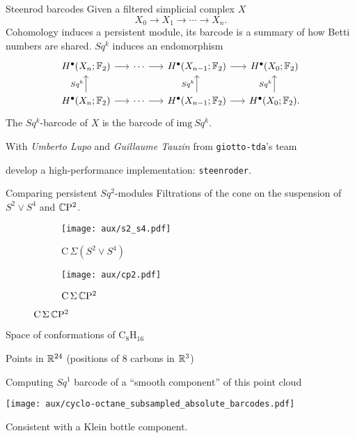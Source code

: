 \begin{frame}[fragile]{Steenrod barcodes}
	Given a filtered simplicial complex $X$
	\[
	X_0 \to X_1 \to \cdots \to X_n.
	\]
	Cohomology induces a \textcolor{pblue}{persistent module}, its \textcolor{pblue}{barcode} is a summary of how Betti numbers are shared.
	$Sq^k$ induces an endomorphism
	\[
	\begin{tikzcd}[column sep = 15]
	H^\bullet(X_n; \Ftwo) \arrow[r] & \cdots \arrow[r] & H^\bullet(X_{n-1}; \Ftwo) \arrow[r] & H^\bullet(X_0; \Ftwo) \\
	H^\bullet(X_n; \Ftwo) \arrow[u, "Sq^k"] \arrow[r] & \cdots \arrow[r] & H^\bullet(X_{n-1}; \Ftwo) \arrow[u, "Sq^k"] \arrow[r] & H^\bullet(X_0; \Ftwo) \arrow[u, "Sq^k"].
	\end{tikzcd}
	\]
	\pause
	The \textcolor{pblue}{$Sq^k$-barcode} of $X$ is the barcode of $\mathrm{img}\ Sq^k$.

	\bigskip\pause

	With \textit{Umberto Lupo} and \textit{Guillaume Tauzin} from \textcolor{pblue}{\texttt{giotto-tda}}'s team

	\medskip
	develop a high-performance implementation: \textcolor{pblue}{\texttt{steenroder}}.
\end{frame}

\begin{frame}{Comparing persistent $Sq^2$-modules} \pause
	Filtrations of the cone on the suspension of $S^2 \vee S^4$ and $\mathbb{C} \mathrm{P}^2$.

	\pause
	\begin{figure}
		\centering
		\begin{subfigure}[b]{0.49\textwidth}
			\centering
			\texttt{[image: aux/s2\_s4.pdf]}
			\caption{$\mathrm C\,\Sigma(S^2 \vee S^4)$}
			\label{f:s2_s4}
		\end{subfigure}
		\begin{subfigure}[b]{0.49\textwidth}
			\centering
			\texttt{[image: aux/cp2.pdf]}
			\caption{$\mathrm C\,\Sigma\,\mathbb{C}\mathrm{P}^2$}
			\label{f:cp2}
		\end{subfigure}
	\end{figure}
\end{frame}

\begin{frame}{Space of conformations of $\mathrm{C_8H_{16}}$}

	Points in $\mathbb{R}^{24}$ (positions of $8$ carbons in $\mathbb{R}^3$)

	\pause\smallskip

	Computing $Sq^1$ barcode of a ``smooth component'' of this point cloud

	\smallskip

	\texttt{[image: aux/cyclo-octane\_subsampled\_absolute\_barcodes.pdf]}

	Consistent with a \textcolor{pblue}{Klein bottle} component.
\end{frame}


